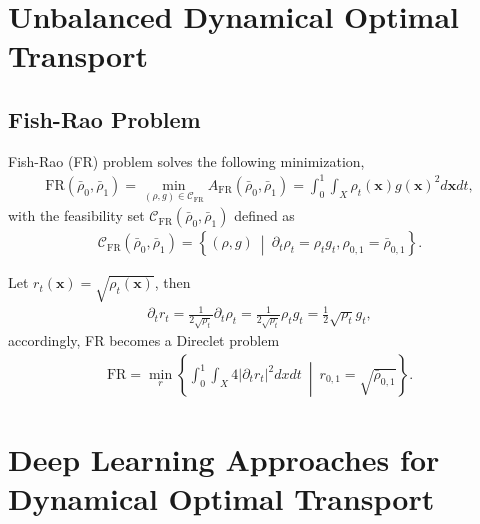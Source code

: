 \documentclass[11pt]{book}
\newcommand{\bx}{\mathbf x}
\begin{document}
\chapter[Unbalanced Dynamical OT]{Unbalanced Dynamical Optimal Transport}\label{chapter:UnbalancedDOT}






\section{Fish-Rao Problem}

Fish-Rao (FR) problem solves the following minimization,
\begin{align}
    \mathrm{FR}(\bar{\rho}_0,\bar{\rho}_1) = \min_{(\rho,g)\in\mathcal{C}_{\mathrm{FR}}} A_{\mathrm{FR}}(\bar{\rho}_0,\bar{\rho}_1) = \int_0^1 \int_X \rho_t(\bx) g(\bx)^2 d\bx dt,
\end{align}
with the feasibility set $\mathcal{C}_{\mathrm{FR}}(\bar{\rho}_0,\bar{\rho}_1)$ defined as
\begin{align}
    \mathcal{C}_{\mathrm{FR}}(\bar{\rho}_0,\bar{\rho}_1) = \left\{ (\rho,g) \ \middle| \ \partial_t\rho_t = \rho_t g_t, \rho_{0,1} = \bar{\rho}_{0,1}  \right\}.
\end{align}

Let $r_t(\bx) = \sqrt{\rho_t(\bx)}$, then 
\begin{align*}
    \partial_t r_t = \frac{1}{2\sqrt{\rho_t}} \partial_t \rho_t = \frac{1}{2\sqrt{\rho_t}}  \rho_t g_t = \frac{1}{2}\sqrt{\rho_t} g_t,
\end{align*}
accordingly, FR becomes a Direclet problem
\begin{align}
    \mathrm{FR} = \min_{r} \left\{ \int_0^1 \int_X 4|\partial_t r_t|^2 dx dt \ \middle| \ r_{0,1} = \sqrt{\bar{\rho}_{0,1}} \right\}.
\end{align}



\chapter[Deep Learning Approaches]{Deep Learning Approaches for Dynamical Optimal Transport}\label{chapter:DL}
\end{document}

